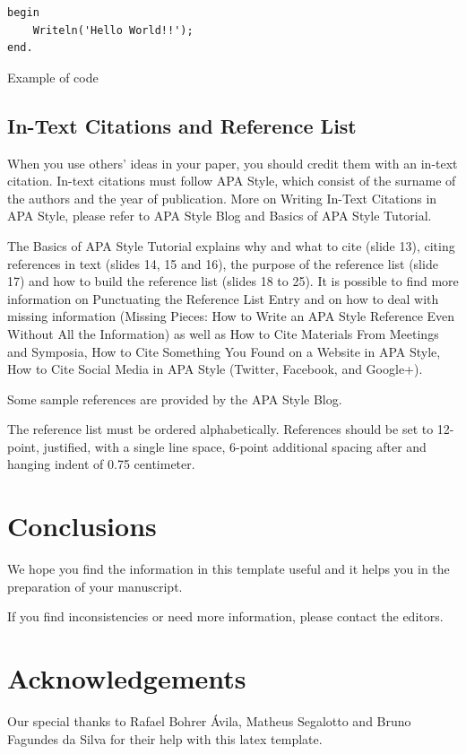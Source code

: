 \documentclass[english,brazilian]{RBIEarticle} %
\begin{document}
\begin{code}[h]
	\begin{lstlisting}
begin
    Writeln('Hello World!!');
end.
	\end{lstlisting}
	\caption{Example of code}
	\label{code:one}
\end{code}


\subsection{In-Text Citations and Reference List}
When you use others' ideas in your paper, you should credit them with an in-text citation. In-text citations must follow APA Style, which consist of the surname of the authors and the year of publication. More on Writing In-Text Citations in APA Style, please refer to APA Style Blog and Basics of APA Style Tutorial.

The Basics of APA Style Tutorial explains why and what to cite (slide 13), citing references in text (slides 14, 15 and 16), the purpose of the reference list (slide 17) and how to build the reference list (slides 18 to 25). It is possible to find more information on Punctuating the Reference List Entry and on how to deal with missing information (Missing Pieces: How to Write an APA Style Reference Even Without All the Information) as well as How to Cite Materials From Meetings and Symposia, How to Cite Something You Found on a Website in APA Style, How to Cite Social Media in APA Style (Twitter, Facebook, and Google+).

Some sample references are provided by the APA Style Blog.

The reference list must be ordered alphabetically. References should be set to 12-point, justified, with a single line space, 6-point additional spacing after and hanging indent of 0.75 centimeter.


\section{Conclusions}
We hope you find the information in this template useful and it helps you in the preparation of your manuscript.

If you find inconsistencies or need more information, please contact the editors.


\section*{Acknowledgements}
Our special thanks to Rafael Bohrer Ávila, Matheus Segalotto and Bruno Fagundes da Silva for their help with this latex template. 
\end{document}
